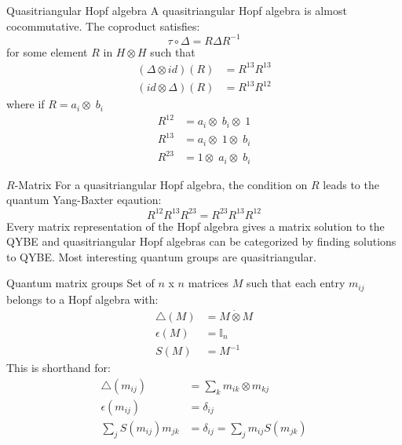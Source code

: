 \documentclass[pdf,colorBG,slideColor,fyma]{prosper}
\def\I1{\mathbb{I}}
\begin{document}
\begin{slide}{Quasitriangular Hopf algebra}
A quasitriangular Hopf algebra is almost cocommutative. The coproduct satisfies:
\[
\tau \circ \Delta = R \Delta R^{-1}
\]
for some element $R$ in $H \otimes H$ such that
\begin{align*}
(\Delta \otimes id)(R) & = R^{13} R^{13} \\
(id \otimes \Delta)(R) & = R^{13} R^{12}
\end{align*}
where if $R = a_{i} \otimes\; b_{i}$
\begin{align*}
R^{12} & = a_{i} \otimes\; b_{i} \otimes\; 1 \\
R^{13} & = a_{i} \otimes\; 1 \otimes\; b_{i} \\
R^{23} & = 1 \otimes\; a_{i} \otimes\; b_{i}
\end{align*}

\end{slide}

\begin{slide}{$R$-Matrix}
For a quasitriangular Hopf algebra, the condition on $R$ leads to the
quantum Yang-Baxter eqaution:
\[
R^{12} R^{13} R^{23} = R^{23} R^{13} R^{12}
\]
Every matrix representation of the Hopf algebra gives a matrix solution to the
QYBE and quasitriangular Hopf algebras can be categorized by finding solutions to QYBE.
\break
\break
Most interesting quantum groups are quasitriangular.
\end{slide}


\begin{slide}{Quantum matrix groups}
Set of $n$ x $n$ matrices $M$ such that each entry $m_{ij}$ belongs to a Hopf algebra with:
\begin{align*}
\triangle(M) &= M \dot{\otimes} M \\
\epsilon(M) &= \I1_n \\
S(M) &= M^{-1}
\end{align*}
This is shorthand for:
\begin{align*}
\triangle(m_{ij}) &= \sum_k m_{ik} \otimes m_{kj} \\
\epsilon(m_{ij}) &= \delta_{ij} \\
\sum_j S(m_{ij}) m_{jk} &= \delta_{ij} = \sum_j m_{ij} S(m_{jk})
\end{align*}
\end{slide}

\end{document}
